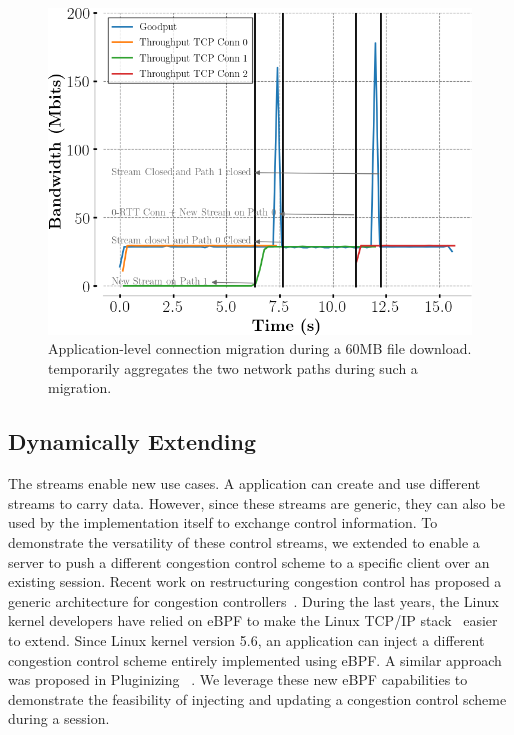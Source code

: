 \begin{figure}[!t]
  \begin{center}
    \includegraphics[width=.8\columnwidth]{figures/migration.png}
  \end{center}
\vspace{-0.5cm}
  \caption{Application-level connection migration during a 60MB file download.
    \tcpls temporarily aggregates the two network paths during such a migration.}
  \label{fig:conn_migration}
\end{figure}

\subsection{Dynamically Extending \tcpls}

The \tcpls streams enable new use cases. A \tcpls application can
create and use different streams to carry data. However, since these streams
are generic, they can also be used by the \tcpls implementation itself to
exchange control information. To demonstrate the versatility of these control
streams, we extended \tcpls to enable a server to push a different congestion
control scheme to a specific client over an existing \tcpls session. Recent
work on restructuring congestion control has proposed a generic architecture
for congestion controllers~\cite{narayan2018restructuring}.
During the last years, the Linux kernel developers have relied on eBPF
to make the Linux TCP/IP stack~\cite{brakmo2017tcp,tran2020beyond} easier
to extend. Since Linux kernel version 5.6, an application can inject
a different congestion control scheme entirely implemented using eBPF. A similar
approach was proposed in Pluginizing \quic~\cite{de2019pluginizing}. We
leverage these new eBPF capabilities to demonstrate the feasibility of injecting
and updating a congestion control scheme during a \tcpls session.

